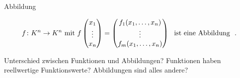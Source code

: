 \documentclass[class=article, crop=false]{standalone}
\begin{document}
\begin{zettel}{Abbildung}
\begin{flashcard}[]{}
	\begin{definition}[Abbildung]
		\[
			f \from K^n\to  K^n \tx{mit} f \begin{pmatrix}
				x_1    \\
				\vdots \\
				x_n    \\
			\end{pmatrix} =
			\begin{pmatrix}
				f_1 (x_1, \dots , x_n) \\
				\vdots                 \\
				f_m (x_1, \dots, x_n)  \\
			\end{pmatrix} \tx{ ist eine Abbildung }
		.\]

	\end{definition}
\end{flashcard}

Unterschied zwischen Funktionen und Abbildungen? Funktionen haben reellwertige Funktionswerte? Abbildungen sind alles andere?
\end{zettel}
\end{document}
